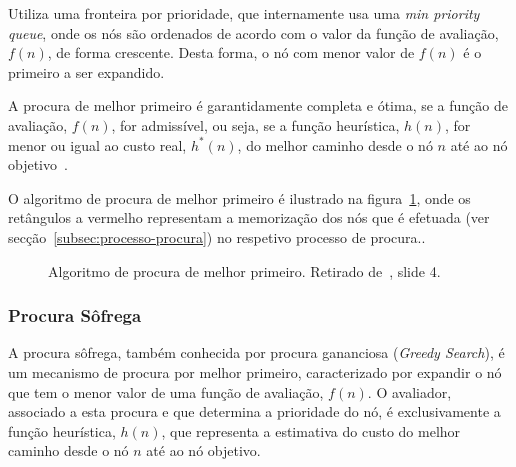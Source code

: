 Utiliza uma fronteira por prioridade, que internamente usa uma \textit{min priority queue}, onde os nós são ordenados de acordo com o valor da função de avaliação, $f(n)$, de forma crescente.
Desta forma, o nó com menor valor de $f(n)$ é o primeiro a ser expandido.

A procura de melhor primeiro é garantidamente completa e ótima, se a função de avaliação, $f(n)$, for admissível, ou seja, se a função heurística, $h(n)$, for menor ou igual ao custo real, $h^*(n)$, do melhor caminho desde o nó $n$ até ao nó objetivo~\cite{ist:leic:resumos:procura-cega}.

O algoritmo de procura de melhor primeiro é ilustrado na figura~\ref{fig:alg-proc-melh-prim}, onde os retângulos a vermelho representam a memorização dos nós que é efetuada (ver secção~\ref{subsec:processo-procura}) no respetivo processo de procura..

\begin{figure}[H]
    \begin{center}
    \end{center}
    \caption{Algoritmo de procura de melhor primeiro. Retirado de~\cite{isel:iasa:slides:proc-espaco-estados-parte-2}, slide 4.}
    \label{fig:alg-proc-melh-prim}
\end{figure}

\subsubsection{Procura Sôfrega}\label{subsubsec:procura-sofrega}

A procura sôfrega, também conhecida por procura gananciosa (\textit{Greedy Search}), é um mecanismo de procura por melhor primeiro, caracterizado por expandir o nó que tem o menor valor de uma função de avaliação, $f(n)$.
O avaliador, associado a esta procura e que determina a prioridade do nó, é exclusivamente a função heurística, $h(n)$, que representa a estimativa do custo do melhor caminho desde o nó $n$ até ao nó objetivo.

